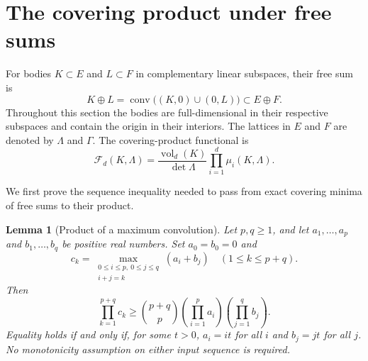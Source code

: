 \documentclass[11pt,a4paper]{article}
\newtheorem{lemma}[theorem]{Lemma}
\theoremstyle{remark}\newtheorem{remark}[theorem]{Remark}
\begin{document}
\section{The covering product under free sums}
\label{r3m:sec-product}

For bodies $K\subset E$ and $L\subset F$ in complementary linear
subspaces, their free sum is
\[
 K\oplus L=\operatorname{conv}\bigl((K,0)\cup(0,L)\bigr)
 \subset E\oplus F.
\]
Throughout this section the bodies are full-dimensional in their
respective subspaces and contain the origin in their interiors.
The lattices in $E$ and $F$ are denoted by $\Lambda$ and $\Gamma$.
The covering-product functional is
\begin{equation}
\label{r3m:eq-covering-product}
 \mathcal F_d(K,\Lambda)=
 \frac{\operatorname{vol}_d(K)}{\det\Lambda}
       \prod_{i=1}^d\mu_i(K,\Lambda).
\end{equation}

We first prove the sequence inequality needed to pass from exact
covering minima of free sums to their product.

\begin{lemma}[Product of a maximum convolution]
\label{r3m:lem-max-product}
Let $p,q\ge1$, and let $a_1,\ldots,a_p$ and $b_1,\ldots,b_q$
be positive real numbers.  Set $a_0=b_0=0$ and
\[
 c_k=\max_{\substack{0\le i\le p,\ 0\le j\le q\\ i+j=k}}
                         (a_i+b_j)\quad(1\le k\le p+q).
\]
Then
\begin{equation}
\label{r3m:eq-max-product}
 \prod_{k=1}^{p+q}c_k
 \ge {p+q\choose p}
       \left(\prod_{i=1}^p a_i\right)
       \left(\prod_{j=1}^q b_j\right).
\end{equation}
Equality holds if and only if, for some $t>0$,
$a_i=it$ for all $i$ and $b_j=jt$ for all $j$.
No monotonicity assumption on either input sequence is required.
\end{lemma}
\end{document}
